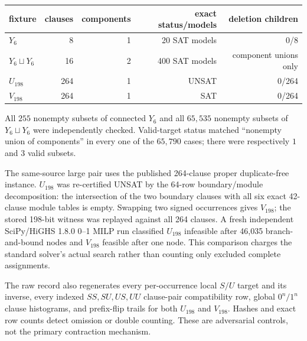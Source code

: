 \documentclass[11pt]{article}
\begin{document}
\begin{center}
\begin{tabular}{lrrrr}
\toprule
fixture & clauses & components & exact status/models & deletion children\\
\midrule
$Y_6$ & 8 & 1 & 20 SAT models & 0/8\\
$Y_6\sqcup Y_6$ & 16 & 2 & 400 SAT models & component unions only\\
$U_{198}$ & 264 & 1 & UNSAT & 0/264\\
$V_{198}$ & 264 & 1 & SAT & 0/264\\
\bottomrule
\end{tabular}
\end{center}
All $255$ nonempty subsets of connected $Y_6$ and all $65{,}535$ nonempty
subsets of $Y_6\sqcup Y_6$ were independently checked.  Valid-target status
matched ``nonempty union of components'' in every one of the $65{,}790$ cases;
there were respectively $1$ and $3$ valid subsets.

The same-source large pair uses the published 264-clause proper duplicate-free
instance.  $U_{198}$ was re-certified UNSAT by the 64-row boundary/module
decomposition: the intersection of the two boundary clauses with all six exact
42-clause module tables is empty.  Swapping two signed occurrences gives
$V_{198}$; the stored 198-bit witness was replayed against all 264 clauses.
A fresh independent SciPy/HiGHS 1.8.0 0--1 MILP run classified $U_{198}$
infeasible after 46,035 branch-and-bound nodes and $V_{198}$ feasible after one
node.  This comparison charges the standard solver's actual search rather than
counting only excluded complete assignments.

The raw record also regenerates every per-occurrence local $S/U$ target and its
inverse, every indexed $SS,SU,US,UU$ clause-pair compatibility row, global
$0^n/1^n$ clause histograms, and prefix-flip trails for both $U_{198}$ and
$V_{198}$.  Hashes and exact row counts detect omission or double counting.
These are adversarial controls, not the primary contraction mechanism.
\end{document}
